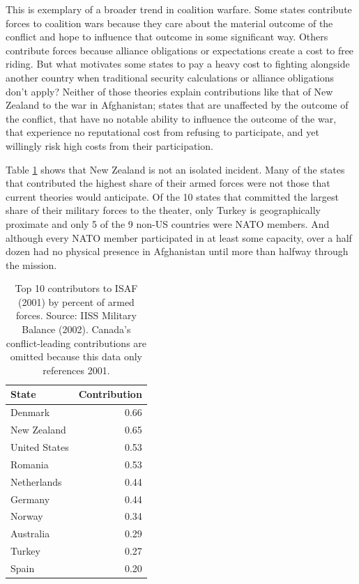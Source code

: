 \documentclass[12pt,letterpaper]{article}
\begin{document}
	This is exemplary of a broader trend in coalition warfare. Some states contribute forces to coalition wars because they care about the material outcome of the conflict and hope to influence that outcome in some significant way. Others contribute forces because alliance obligations or expectations create a cost to free riding. But what motivates some states to pay a heavy cost to fighting alongside another country when traditional security calculations or alliance obligations don't apply? Neither of those theories explain contributions like that of New Zealand to the war in Afghanistan; states that are unaffected by the outcome of the conflict, that have no notable ability to influence the outcome of the war, that experience no reputational cost from refusing to participate, and yet willingly risk high costs from their participation.
	
	Table \ref{table:2001_top} shows that New Zealand is not an isolated incident. Many of the states that contributed the highest share of their armed forces were not those that current theories would anticipate. Of the 10 states that committed the largest share of their military forces to the theater, only Turkey is geographically proximate and only 5 of the 9 non-US countries were NATO members. And although every NATO member participated in at least some capacity, over a half dozen had no physical presence in Afghanistan until more than halfway through the mission.

	\begin{table}[ht]
		\centering
		\begin{tabular}{|lr|}
			\hline
			\textbf{State} & \textbf{Contribution} \\
			\hline
			Denmark & 0.66 \\
			New Zealand & 0.65 \\
			United States & 0.53 \\
			Romania & 0.53 \\
			Netherlands & 0.44 \\
			Germany & 0.44 \\
			Norway & 0.34 \\
			Australia & 0.29 \\
			Turkey & 0.27 \\
			Spain & 0.20 \\
			\hline
		\end{tabular}
	\caption{Top 10 contributors to ISAF (2001) by percent of armed forces. Source: IISS Military Balance (2002). Canada's conflict-leading contributions are omitted because this data only references 2001.}
	\label{table:2001_top}
	\end{table}
\end{document}
